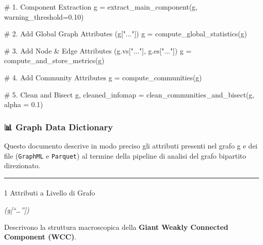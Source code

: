 \documentclass[
  italian,
  a4paper,
]{article}
\makeatletter
\let\oldparagraph\paragraph
\renewcommand{\paragraph}{
    \@ifstar
      \xxxParagraphStar
      \xxxParagraphNoStar
  }
\newcommand{\xxxParagraphStar}[1]{\oldparagraph*{#1}\mbox{}}
\newcommand{\xxxParagraphNoStar}[1]{\oldparagraph{#1}\mbox{}}
\newenvironment{Shaded}{\begin{snugshade}}{\end{snugshade}}
\newcommand{\CommentTok}[1]{\textcolor[rgb]{0.37,0.37,0.37}{#1}}
\newcommand{\FloatTok}[1]{\textcolor[rgb]{0.68,0.00,0.00}{#1}}
\newcommand{\NormalTok}[1]{\textcolor[rgb]{0.00,0.23,0.31}{#1}}
\newcommand{\OperatorTok}[1]{\textcolor[rgb]{0.37,0.37,0.37}{#1}}
\makeatother
\begin{document}
\begin{Shaded}
\begin{Highlighting}[]
\CommentTok{\# 1. Component Extraction}
\NormalTok{g }\OperatorTok{=}\NormalTok{ extract\_main\_component(g, warning\_threshold}\OperatorTok{=}\FloatTok{0.10}\NormalTok{)}

\CommentTok{\# 2. Add Global Graph Attributes (g["..."])}
\NormalTok{g }\OperatorTok{=}\NormalTok{ compute\_global\_statistics(g)}

\CommentTok{\# 3. Add Node \& Edge Attributes (g.vs["..."], g.es["..."])}
\NormalTok{g }\OperatorTok{=}\NormalTok{ compute\_and\_store\_metrics(g)}

\CommentTok{\# 4. Add Community Attributes}
\NormalTok{g }\OperatorTok{=}\NormalTok{ compute\_communities(g)}

\CommentTok{\# 5. Clean and Bisect}
\NormalTok{g, cleaned\_infomap }\OperatorTok{=}\NormalTok{ clean\_communities\_and\_bisect(g, alpha }\OperatorTok{=} \FloatTok{0.1}\NormalTok{)}
\end{Highlighting}
\end{Shaded}

\subsubsection{📊 Graph Data Dictionary}\label{graph-data-dictionary}

Questo documento descrive in modo preciso gli attributi presenti nel
grafo g e dei file (\texttt{GraphML} e \texttt{Parquet}) al termine
della pipeline di analisi del grafo bipartito direzionato.

\begin{center}\rule{0.5\linewidth}{0.5pt}\end{center}

\paragraph{1 Attributi a Livello di
Grafo}\label{attributi-a-livello-di-grafo}

\emph{(g{[}``\ldots{}''{]})}

Descrivono la struttura macroscopica della \textbf{Giant Weakly
Connected Component (WCC)}.
\end{document}
